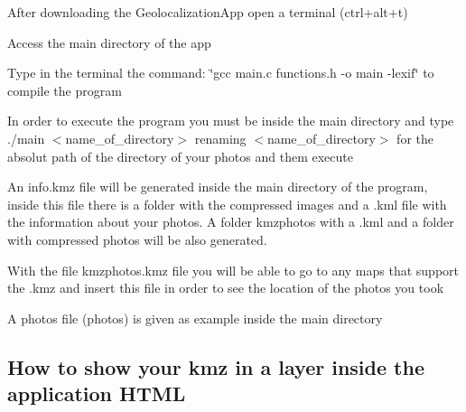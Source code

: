 \begin{DoxyEnumerate}
\item After downloading the Geolocalization\+App open a terminal (ctrl+alt+t) 
\item Access the main directory of the app 
\item Type in the terminal the command\+: \char`\"{}gcc main.\+c functions.\+h -\/o main -\/lexif\char`\"{} to compile the program 
\item In order to execute the program you must be inside the main directory and type ./main $<$name\+\_\+of\+\_\+directory$>$ renaming $<$name\+\_\+of\+\_\+directory$>$ for the absolut path of the directory of your photos and them execute 
\item An info.\+kmz file will be generated inside the main directory of the program, inside this file there is a folder with the compressed images and a .kml file with the information about your photos. A folder kmzphotos with a .kml and a folder with compressed photos will be also generated. 
\item With the file kmzphotos.\+kmz file you will be able to go to any maps that support the .kmz and insert this file in order to see the location of the photos you took 
\item A photos file (photos) is given as example inside the main directory 
\end{DoxyEnumerate}

\subsection*{How to show your kmz in a layer inside the application H\+T\+ML}


